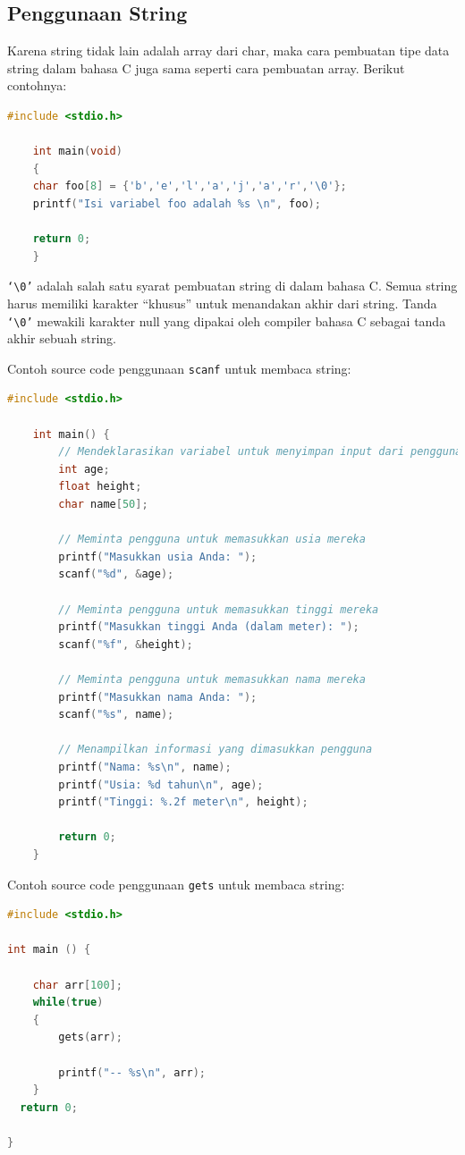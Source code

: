 \subsection{Penggunaan String}
Karena string tidak lain adalah array dari char, maka cara pembuatan tipe data string dalam bahasa C juga sama seperti cara pembuatan array. Berikut contohnya:
\begin{lstlisting}[language=c,caption = Contoh String dari Char,label=lst:array1d01]
	#include <stdio.h>
 
	int main(void)
	{
	char foo[8] = {'b','e','l','a','j','a','r','\0'};
	printf("Isi variabel foo adalah %s \n", foo);
	
	return 0;
	}
\end{lstlisting}

\verb|‘\0’| adalah salah satu syarat pembuatan string di dalam bahasa C.
Semua string harus memiliki karakter “khusus” untuk menandakan akhir dari string.
Tanda \verb|‘\0’| mewakili karakter null yang dipakai oleh compiler bahasa C sebagai tanda akhir sebuah string.

Contoh source code penggunaan \verb|scanf| untuk membaca string:
\begin{lstlisting}[language=c,caption = Contoh String dengan scanf,label=lst:scanf]
	#include <stdio.h>

	int main() {
		// Mendeklarasikan variabel untuk menyimpan input dari pengguna
		int age;
		float height;
		char name[50];

		// Meminta pengguna untuk memasukkan usia mereka
		printf("Masukkan usia Anda: ");
		scanf("%d", &age);
		
		// Meminta pengguna untuk memasukkan tinggi mereka
		printf("Masukkan tinggi Anda (dalam meter): ");
		scanf("%f", &height);
		
		// Meminta pengguna untuk memasukkan nama mereka
		printf("Masukkan nama Anda: ");
		scanf("%s", name);

		// Menampilkan informasi yang dimasukkan pengguna
		printf("Nama: %s\n", name);
		printf("Usia: %d tahun\n", age);
		printf("Tinggi: %.2f meter\n", height);

		return 0;
	}
\end{lstlisting}


Contoh source code penggunaan \verb|gets| untuk membaca string:
\begin{lstlisting}[language=c,caption = Contoh String dengan gets,label=lst:gets]
#include <stdio.h>

int main () {
  
	char arr[100];
	while(true)
	{
		gets(arr);
		
		printf("-- %s\n", arr);
	}
  return 0;

}
\end{lstlisting}

